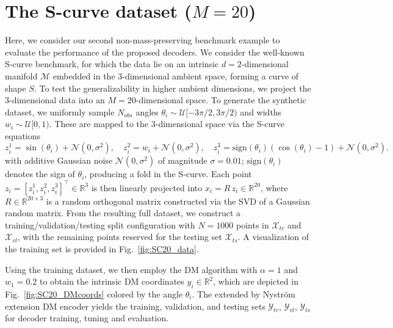 \documentclass{article}
\begin{document}
\clearpage
\newpage
\renewcommand{\theequation}{F.\arabic{equation}}
\renewcommand{\thefigure}{F.\arabic{figure}}
\renewcommand{\thetable}{F.\arabic{table}}
\setcounter{equation}{0}
\setcounter{figure}{0}
\setcounter{table}{0}
\section{The S-curve dataset (\texorpdfstring{$M=20$}{M=20})}
\label{app:SC20}

Here, we consider our second non-mass-preserving benchmark example to evaluate the performance of the proposed decoders. We consider the well-known S-curve benchmark, for which the data lie on an intrinsic $d=2$-dimensional manifold $\mathcal{M}$ embedded in the $3$-dimensional ambient space, forming a curve of shape $S$. To test the generalizability in higher ambient dimensions, we project the $3$-dimensional data into an $M=20$-dimensional space. To generate the synthetic dataset, we uniformly sample $N_{obs}$ angles $\theta_i\sim \mathcal{U}[-3\pi/2, 3\pi/2)$ and widths $w_i\sim \mathcal{U}[0, 1)$. These are mapped to the $3$-dimensional space via the S-curve equations
\begin{equation}
z^1_i = \sin(\theta_i) + \mathcal{N}(0,\sigma^2), \quad z^2_i = w_i + \mathcal{N}(0,\sigma^2), \quad z^3_i = \text{sign}(\theta_i) (\cos(\theta_i) - 1) + \mathcal{N}(0,\sigma^2). \label{eq:SCurveeq}
\end{equation}
with additive Gaussian noise $\mathcal{N}(0,\sigma^2)$ of magnitude $\sigma=0.01$; $\text{sign}(\theta_i)$ denotes the sign of $\theta_i$, producing a fold in the S-curve. Each point $z_i=[z^1_i,z^2_i,z^3_i]^\top\in \mathbb{R}^3$ is then linearly projected into $x_i=R\, z_i\in \mathbb{R}^{20}$, where $R\in\mathbb{R}^{20\times 3}$ is a random orthogonal matrix constructed via the SVD of a Gaussian random matrix. From the resulting full dataset, we construct a training/validation/testing split configuration with $N=1000$ points in $\mathcal{X}_{tr}$ and $\mathcal{X}_{vl}$, with the remaining points reserved for the testing set $\mathcal{X}_{ts}$. A visualization of the training set is provided in Fig.~\ref{fig:SC20_data}. 

Using the training dataset, we then employ the DM algorithm with $\alpha=1$ and $w_1=0.2$ to obtain the intrinsic DM coordinates $y_i\in \mathbb{R}^2$, which are depicted in Fig.~\ref{fig:SC20_DMcoords} colored by the angle $\theta_i$. The extended by Nystr\"{o}m extension DM encoder yields the training, validation, and testing sets $\mathcal{Y}_{tr}$, $\mathcal{Y}_{vl}$, $\mathcal{Y}_{ts}$ for decoder training, tuning and evaluation.
\end{document}
